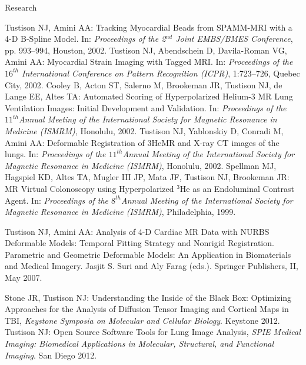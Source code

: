 \documentclass{resume}
\begin{document}
\begin{category}{Research}
\begin{itemize}
    \citemnobullet  Tustison NJ, Amini AA: Tracking Myocardial Beads from SPAMM-MRI with a 4-D B-Spline Model. In:  {\em Proceedings of the 2$^{nd}$ Joint EMBS/BMES Conference}, pp. 993--994, Houston, 2002.
    \citemnobullet Tustison NJ, Abendschein D, Davila-Roman VG, Amini AA: Myocardial Strain Imaging with Tagged MRI. In: {\em Proceedings of the $16^{th}$ International Conference on Pattern Recognition (ICPR)}, 1:723--726, Quebec City, 2002.
    \citemnobullet Cooley B, Acton ST, Salerno M, Brookeman JR, Tustison NJ, de Lange EE, Altes TA: Automated Scoring of Hyperpolarized Helium-3 MR Lung Ventilation Images: Initial Development and Validation.  In:  {\em Proceedings of the $11^{th}$Annual  Meeting of the International Society for Magnetic Resonance in Medicine (ISMRM)}, Honolulu, 2002.     
    \citemnobullet Tustison NJ, Yablonskiy D, Conradi M, Amini AA: Deformable Registration of 3HeMR and X-ray CT images of the lungs.  In:  {\em Proceedings of the $11^{th}$Annual  Meeting of the International Society for Magnetic Resonance in Medicine (ISMRM)}, Honolulu, 2002.     
    \citemnobullet  Spellman MJ, Hagspiel KD, Altes TA, Mugler III JP, Mata JF, Tustison NJ, Brookeman JR: MR Virtual Colonoscopy using Hyperpolarized $^3$He as an Endoluminal Contrast Agent. In:  {\em Proceedings of the $8^{th}$Annual  Meeting of the International Society for Magnetic Resonance in Medicine (ISMRM)}, Philadelphia, 1999.            
   \end{itemize}


   \begin{itemize}
   \citemnobullet Tustison NJ,  Amini AA: Analysis of 4-D Cardiac MR Data with NURBS Deformable Models:  Temporal Fitting Strategy and Nonrigid Registration. Parametric and Geometric Deformable Models:  An Application in Biomaterials and Medical Imagery. Jasjit S. Suri and Aly Farag (eds.). Springer Publishers, II, May 2007.
   \end{itemize}


   \begin{itemize}
   \citemnobullet Stone JR, Tustison NJ:  Understanding the Inside of the Black Box: 
   Optimizing Approaches for the Analysis of Diffusion Tensor Imaging and Cortical Maps in TBI,
   {\em Keystone Symposia on Molecular and Cellular Biology}.  Keystone 2012.
   \citemnobullet Tustison NJ:  Open Source Software Tools for Lung Image Analysis, 
   {\em SPIE Medical Imaging: Biomedical Applications in Molecular, Structural, and 
   Functional Imaging}. San Diego 2012. 
   \end{itemize}


\end{category}
\end{document}
